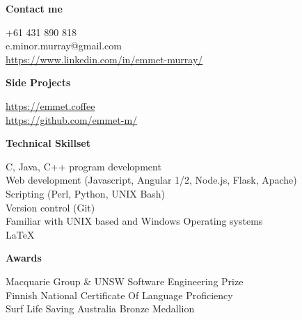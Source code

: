 \documentclass{article}
\newcommand{\mytitle}[1]{{\Large \textbf{#1}} \vspace{0.2cm}}
\begin{document}
\begin{minipage}[t]{0.3\linewidth}
    \vspace{0.2cm}
    {
        \mytitle{Contact me}
        
        +61 431 890 818 \\
        e.minor.murray@gmail.com \\
        \href{https://emmet.coffe://www.linkedin.com/in/emmet-murray/}{https://www.linkedin.com/in/emmet-murray/} \\

    }
    \vspace{0.2cm}
    {
        \mytitle{Side Projects}
        
        \href{https://emmet.coffee}{https://emmet.coffee} \\
        \href{https://github.com/emmet-m/}{https://github.com/emmet-m/} \\
        
    }
    \vspace{0.3cm}
    
    {
        \mytitle{Technical Skillset}

        C, Java, C++ program development \\ 

        Web development (Javascript, Angular 1/2, Node.js, Flask, Apache) \\

        Scripting (Perl, Python, UNIX Bash) \\

        Version control (Git) \\

        Familiar with UNIX based and Windows Operating systems \\

        {\large \LaTeX}
    }

    \vspace{0.5cm}

    {
        \mytitle{Awards}

        Macquarie Group \& UNSW Software Engineering Prize \\

        Finnish National Certificate Of Language Proficiency \\

        Surf Life Saving Australia Bronze Medallion \\
    }
%
%
\end{minipage}
%
\end{document}
